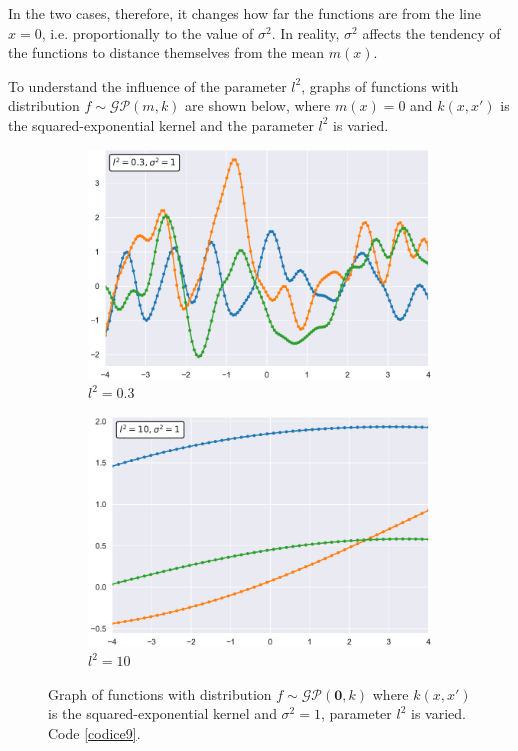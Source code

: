 In the two cases, therefore, it changes how far the functions are from the line $x=0$, i.e. proportionally to the value of $\sigma^2$. In reality, $\sigma^2$ affects the tendency of the functions to distance themselves from the mean $m(x)$.

To understand the influence of the parameter $l^2$, graphs of functions with distribution $f\sim \mathcal{GP}(m,k)$ are shown below, where $m(x)=0$ and $k(x,x')$ is the squared-exponential kernel and the parameter $l^2$ is varied.


\begin{figure}[h]
\centering
\begin{subfigure}{.5\textwidth}
  \centering
  \includegraphics[width=\linewidth]{images/Gaussian process/RBF - l=03.pdf}
  \caption{$l^2=0.3$}
\end{subfigure}%
\begin{subfigure}{.5\textwidth}
  \centering
  \includegraphics[width=\linewidth]{images/Gaussian process/RBF - l=10.pdf}
  \caption{$l^2=10$}
\end{subfigure}
\caption{Graph of functions with distribution  $f\sim \mathcal{GP}(\bm{0},k)$ where $k(x,x')$ is the squared-exponential kernel and $\sigma^2=1$, parameter $l^2$ is varied. Code \ref{codice9}.}
\label{10 sample exponential modified l}
\end{figure}

